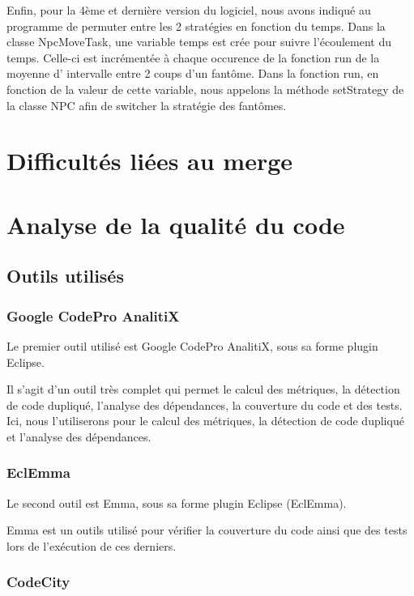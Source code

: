 \documentclass[a4paper,12pt]{report} %
\begin{document}
Enfin, pour la 4ème et dernière version du logiciel, nous avons indiqué au programme de permuter entre les 2 stratégies en fonction du temps.
Dans la classe NpcMoveTask, une variable temps est crée pour suivre l'écoulement du temps. Celle-ci est incrémentée à chaque occurence de la fonction run de la moyenne d' intervalle entre 2 coups d'un fantôme. 
Dans la fonction run, en fonction de la valeur de cette variable, nous appelons la méthode setStrategy de la classe NPC afin de switcher la stratégie des fantômes.

\section{Difficultés liées au merge}

\section{Analyse de la qualité du code}


\subsection{Outils utilisés}


\subsubsection{Google CodePro AnalitiX}

Le premier outil utilisé est Google CodePro AnalitiX, sous sa forme
plugin Eclipse.

Il s'agit d'un outil très complet qui permet le calcul des métriques,
la détection de code dupliqué, l'analyse des dépendances, la couverture
du code et des tests. Ici, nous l'utiliserons pour le calcul des métriques,
la détection de code dupliqué et l'analyse des dépendances.


\subsubsection{EclEmma}

Le second outil est Emma, sous sa forme plugin Eclipse (EclEmma).

Emma est un outils utilisé pour vérifier la couverture du code ainsi
que des tests lors de l'exécution de ces derniers.


\subsubsection{CodeCity}
\end{document}
